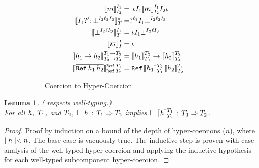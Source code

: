 \documentclass[acmtog, authorversion, acmlarge]{acmart}
\newtheorem{lem}{Lemma}
\newtheorem{pos}{Postulate}
\begin{document}
\begin{figure}[b]
\begin{subfigure}{.5\textwidth}
\begin{align*}
      \\    
      \interp{\Int}{\I_1}{\I_2}
      &= \hc{\pmt}{\I_1}{\interpm{\Int}{\I_1}{\I_2}}{\I_2}{\imt}
      \\
      \interp{\Seq{\prj[\I_1]{\Lbl}}
                  {\failed{\I_2}{\Lbl_2}{\I_3}}}
             {\Dyn}{\T}
      &=
      \hcfail{\prj{\Lbl_1}}{\I_1}{\I_2}{\Lbl_2}{\I_3}
      \\
      \interp{\failed{\I_2}{\Lbl}{\I_3}}
             {\I_1}{\T}
             &=
             \hcfail{\pmt}{\I_1}{\I_2}{\Lbl}{\I_3}
      \\
      \interpm{\id[\I]}{\I}{\I} &= \id
      \\
      \interpm{\fn{\HC_1}{\HC_2}}
             {\Fn{\T_1}{\T_2}}{\Fn{\T_3}{\T_4}}
             &=
      \fn{\interp{\HC_1}{\T_3}{\T_1}}
         {\interp{\HC_2}{\T_2}{\T_4}}
      \\
      \interpm{\rf{\HC_1}{\HC_2}}
             {\Ref{\T_1}}{\Ref{\T_2}}
             &=
      \rf{\interp{\HC_1}{\T_2}{\T_1}}
         {\interp{\HC_2}{\T_1}{\T_2}}
    \end{align*}
    \caption{Coercion to Hyper-Coercion}
    \label{fig:c2h}
    \end{subfigure}
    \caption{}
    \label{fig:Crcn}
\end{figure}




  



\begin{lem}
  \label{lem:iso_wt}
  ( respects well-typing.)\\
  For all $\HC$, $\T_1$, and $\T_2$,
  $\cwt{\HC}{\T_1}{\T_2}$
  implies
  $\cwt{\interp{\HC}{\T_1}{\T_2}}{\T_1}{\T_2}$.
\end{lem}
\begin{proof}
  Proof by induction on a bound of the depth of hyper-coercions ($n$),
  where $\depth{\HC} < n$. The base case is vacuously true.
  The inductive step is proven with case analysis of the well-typed
  hyper-coercion and applying the inductive hypothesis for each well-typed
  subcomponent hyper-coercion. 
\end{proof}
\end{document}
